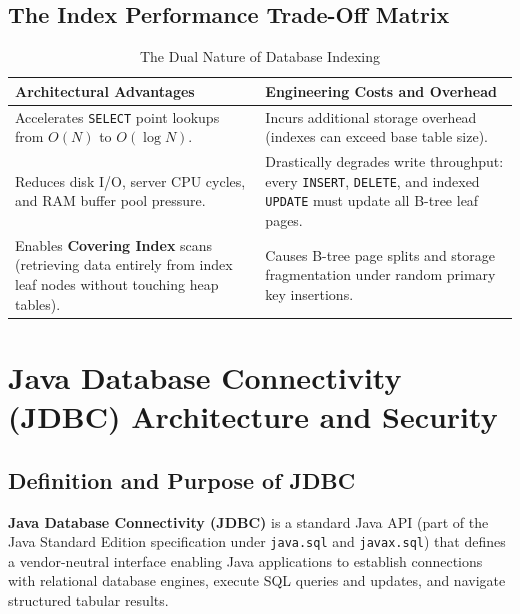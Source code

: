 \subsection{The Index Performance Trade-Off Matrix}
\begin{table}[htbp]
\centering
\small
\caption{The Dual Nature of Database Indexing}
\label{tab:index_tradeoffs}
\begin{tabularx}{\textwidth}{X X}
\toprule
\textbf{Architectural Advantages} & \textbf{Engineering Costs and Overhead} \\
\midrule
Accelerates \texttt{SELECT} point lookups from $O(N)$ to $O(\log N)$. & Incurs additional storage overhead (indexes can exceed base table size). \\
Reduces disk I/O, server CPU cycles, and RAM buffer pool pressure. & Drastically degrades write throughput: every \texttt{INSERT}, \texttt{DELETE}, and indexed \texttt{UPDATE} must update all B-tree leaf pages. \\
Enables \textbf{Covering Index} scans (retrieving data entirely from index leaf nodes without touching heap tables). & Causes B-tree page splits and storage fragmentation under random primary key insertions. \\
\bottomrule
\end{tabularx}
\end{table}

\section{Java Database Connectivity (JDBC) Architecture and Security}
\label{sec:dbms_jdbc}

\subsection{Definition and Purpose of JDBC}
\textbf{Java Database Connectivity (JDBC)} is a standard Java API (part of the Java Standard Edition specification under \texttt{java.sql} and \texttt{javax.sql}) that defines a vendor-neutral interface enabling Java applications to establish connections with relational database engines, execute SQL queries and updates, and navigate structured tabular results.

